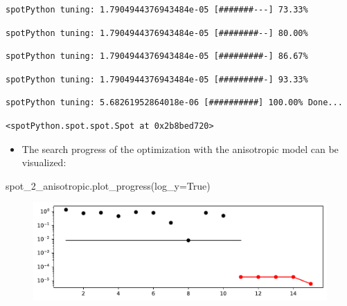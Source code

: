 \documentclass[
  letterpaper,
  DIV=11,
  numbers=noendperiod]{scrreprt}
\newenvironment{Shaded}{\begin{snugshade}}{\end{snugshade}}
\newcommand{\NormalTok}[1]{\textcolor[rgb]{0.00,0.23,0.31}{#1}}
\newcommand{\OperatorTok}[1]{\textcolor[rgb]{0.37,0.37,0.37}{#1}}
\newcommand{\VariableTok}[1]{\textcolor[rgb]{0.07,0.07,0.07}{#1}}
\providecommand{\tightlist}{%
  \setlength{\itemsep}{0pt}\setlength{\parskip}{0pt}}\usepackage{longtable,booktabs,array}
\begin{document}
\begin{verbatim}
spotPython tuning: 1.7904944376943484e-05 [#######---] 73.33% 
\end{verbatim}

\begin{verbatim}
spotPython tuning: 1.7904944376943484e-05 [########--] 80.00% 
\end{verbatim}

\begin{verbatim}
spotPython tuning: 1.7904944376943484e-05 [#########-] 86.67% 
\end{verbatim}

\begin{verbatim}
spotPython tuning: 1.7904944376943484e-05 [#########-] 93.33% 
\end{verbatim}

\begin{verbatim}
spotPython tuning: 5.68261952864018e-06 [##########] 100.00% Done...
\end{verbatim}

\begin{verbatim}
<spotPython.spot.spot.Spot at 0x2b8bed720>
\end{verbatim}

\begin{itemize}
\tightlist
\item
  The search progress of the optimization with the anisotropic model can
  be visualized:
\end{itemize}

\begin{Shaded}
\begin{Highlighting}[]
\NormalTok{spot\_2\_anisotropic.plot\_progress(log\_y}\OperatorTok{=}\VariableTok{True}\NormalTok{)}
\end{Highlighting}
\end{Shaded}

\begin{figure}[H]

{\centering \includegraphics{009_num_spot_anisotropic_files/figure-pdf/cell-9-output-1.pdf}

}

\end{figure}
\end{document}
